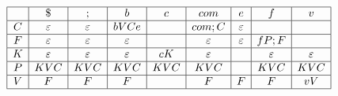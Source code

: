 $
\begin{array}{|c|c|c|c|c|c|c|c|c|}
	\hline 
	& \$ & ; & b & c & com & e & f & v \\
	\hline 
	C & \varepsilon  & \varepsilon  & bVCe & & com;C & \varepsilon  & & \\
	\hline 
	F & \varepsilon  & \varepsilon  & \varepsilon  & & \varepsilon  & \varepsilon  & fP;F & \\
	\hline 
	K & \varepsilon  & \varepsilon  & \varepsilon  & cK & \varepsilon  & & \varepsilon  & \varepsilon  \\
	\hline 
	P & KVC & KVC & KVC & KVC & KVC & & KVC & KVC \\
	\hline 
	V & F & F & F & & F & F & F & vV \\
	\hline
\end{array}
$